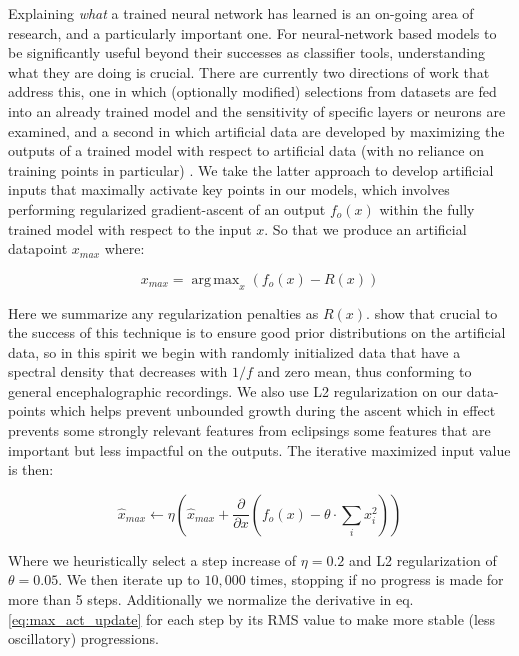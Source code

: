 \documentclass[fleqn,10pt]{wlscirep}
\DeclareMathOperator*{\argmaxA}{arg\,max}
\begin{document}
Explaining {\em what} a trained neural network has learned is an on-going area of research, and a particularly important one. For neural-network based models to be significantly useful beyond their successes as classifier tools, understanding what they are doing is crucial. There are currently two directions of work that address this, one in which (optionally modified) selections from datasets are fed into an already trained model and the sensitivity of specific layers or neurons are examined, and a second in which artificial data are developed by maximizing the outputs of a trained model with respect to artificial data (with no reliance on training points in particular) \cite{Yosinski2015}. We take the latter approach to develop artificial inputs that maximally activate key points in our models, which involves performing regularized gradient-ascent of an output $f_o(x)$ within the fully trained model with respect to the input $x$. So that we produce an artificial datapoint $x_{max}$ where:

\begin{equation} \label{eq:max_act}
  x_{max} = \argmaxA_x(f_o(x) - R(x))
\end{equation}

Here we summarize any regularization penalties as $R(x)$. \cite{Yosinski2015} show that crucial to the success of this technique is to ensure good prior distributions on the artificial data, so in this spirit we begin with randomly initialized data that have a spectral density that decreases with $1/f$ and zero mean, thus conforming to general encephalographic recordings. We also use L2 regularization on our data-points which helps prevent unbounded growth during the ascent which in effect prevents some strongly relevant features from eclipsings some features that are important but less impactful on the outputs. The iterative maximized input value is then:

\begin{equation} \label{eq:max_act_update}
  \hat{x}_{max} \leftarrow \eta \left(\hat{x}_{max} + \frac{\partial }{\partial x}(f_o(x) - \theta \cdot {}\sum_ix_i^2) \right)
\end{equation}

Where we heuristically select a step increase of $\eta = 0.2$ and L2 regularization of $\theta = 0.05$. We then iterate up to $10,000$ times, stopping if no progress is made for more than 5 steps. Additionally we normalize the derivative in eq. \ref{eq:max_act_update} for each step by its RMS value to make more stable (less oscillatory) progressions.
\end{document}
